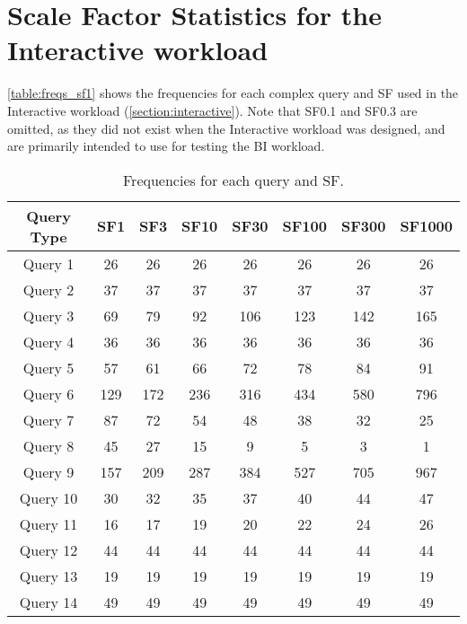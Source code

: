 \section{Scale Factor Statistics for the Interactive workload}\label{appendix:scale_factors}

\autoref{table:freqs_sf1} shows the frequencies for each complex query and SF used in the Interactive workload (\autoref{section:interactive}). Note that SF0.1 and SF0.3 are omitted, as they did not exist when the Interactive workload was designed, and are primarily intended to use for testing the BI workload.

\begin{table}[H]
\centering
\begin{tabular}{|c|c|c|c|c|c|c|c|}
   \hline
   \textbf{Query Type} & \textbf{SF1} & \textbf{SF3}& \textbf{SF10} & \textbf{SF30} & \textbf{SF100} & \textbf{SF300} & \textbf{SF1000} \\ 
   \hline
   \hline
   Query 1 & 26  & 26  & 26  & 26  & 26  & 26  & 26 \\ 
   \hline                                           
   Query 2 & 37  & 37  & 37  & 37  & 37  & 37  & 37 \\  
   \hline                                           
   Query 3 & 69  & 79  & 92  & 106 & 123 & 142 & 165\\ 
   \hline                                           
   Query 4 & 36  & 36  & 36  & 36  & 36  & 36  & 36 \\ 
   \hline                                           
   Query 5 & 57  & 61  & 66  & 72  & 78  & 84  & 91 \\ 
   \hline                                           
   Query 6 & 129 & 172 & 236 & 316 & 434 & 580 & 796\\  
   \hline                                           
   Query 7 & 87 & 72   & 54  & 48  & 38  & 32  & 25 \\ 
   \hline
   Query 8 & 45 &  27  & 15  & 9   & 5   & 3   & 1  \\ 
   \hline                                           
   Query 9 & 157 & 209 & 287 & 384 & 527 & 705 & 967\\  
   \hline                                           
   Query 10 & 30 & 32  & 35  & 37  & 40  & 44  & 47 \\ 
   \hline                                           
   Query 11 & 16 & 17  & 19  & 20  & 22  & 24  & 26 \\ 
   \hline                                           
   Query 12 & 44 & 44  & 44  & 44  & 44  & 44  & 44 \\ 
   \hline                                           
   Query 13 & 19 & 19  & 19  & 19  & 19  & 19  & 19 \\  
   \hline                                           
   Query 14 & 49 & 49  & 49  & 49  & 49  & 49  & 49 \\ 
   \hline
   \end{tabular}
   \caption{Frequencies for each query and SF.}
   \label{table:freqs_sf1}
\end{table}

